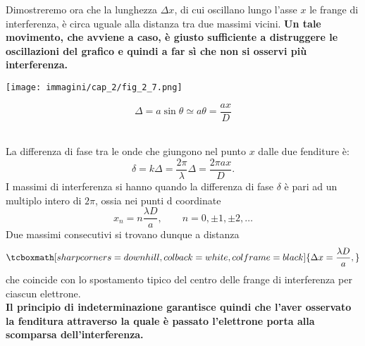 \documentclass[a4paper,12pt,oneside]{book}
\begin{document}
Dimostreremo ora che la lunghezza $\Delta x$, di cui oscillano lungo l'asse $x$ le frange di interferenza, è circa uguale alla distanza tra due massimi vicini. \textbf{Un tale movimento, che avviene a caso, è giusto sufficiente a distruggere le oscillazioni del grafico e quindi a far sì che non si osservi più interferenza.}\\
\vspace{1cm}
\begin{minipage}{.5\textwidth}
\texttt{[image: immagini/cap\_2/fig\_2\_7.png]}	
\end{minipage}
\begin{minipage}{.5\textwidth}
\begin{equation}
\Delta = a \sin \theta \simeq a \theta = \frac{ax}{D}
\end{equation}
\end{minipage}\\
\vspace{.5cm}
La differenza di fase tra le onde che giungono nel punto $x$ dalle due fenditure è:
	\begin{equation}
		\delta = k\Delta =\frac{2 \pi }{\lambda}\Delta = \frac{2 \pi a x}{D}.
	\end{equation}
I massimi di interferenza si hanno quando la differenza di fase $\delta $ è pari ad un multiplo intero di $2 \pi$, ossia nei punti d coordinate
	\begin{equation}
		x_n =n\frac{\lambda D}{a}, \qquad n=0,\pm 1, \pm 2, \dots 
	\end{equation}
Due massimi consecutivi si trovano dunque a distanza 
	\begin{equation}
		\tcboxmath[sharp corners=downhill, colback=white, colframe=black]{
			\Delta x = \frac{\lambda D}{a},
			}
	\end{equation}
che coincide con lo spostamento tipico del centro delle frange di interferenza per ciascun elettrone.\\

\textbf{Il principio di indeterminazione garantisce quindi che l'aver osservato la fenditura attraverso la quale è passato l'elettrone porta alla scomparsa dell'interferenza.}
\end{document}
